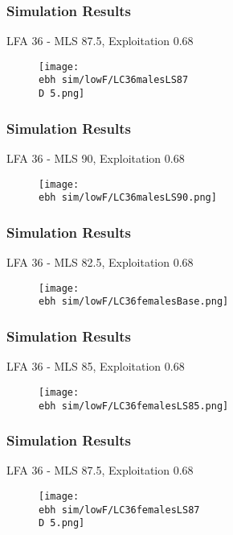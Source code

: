 \documentclass{beamer}
\newcommand{\ebh}{/SpinDr/backup/bio_data/bio.lobster/figures/LFA3438Framework2019/Brad/} %
\newcommand{\D}{.}
\begin{document}
\begin{frame}
\frametitle{Simulation Results}
LFA 36 - MLS 87.5, Exploitation 0.68
\begin{figure}
        \begin{center}
            \texttt{[image: \\ebh sim/lowF/LC36malesLS87\\D 5.png]}
        \end{center}
    \end{figure}
\end{frame}


\begin{frame}
\frametitle{Simulation Results}
LFA 36 - MLS 90, Exploitation 0.68
\begin{figure}
        \begin{center}
            \texttt{[image: \\ebh sim/lowF/LC36malesLS90.png]}
        \end{center}
    \end{figure}
\end{frame}




\begin{frame}
\frametitle{Simulation Results}
LFA 36 - MLS 82.5, Exploitation 0.68
\begin{figure}
        \begin{center}
            \texttt{[image: \\ebh sim/lowF/LC36femalesBase.png]}
        \end{center}
    \end{figure}
\end{frame}



\begin{frame}
\frametitle{Simulation Results}
LFA 36 - MLS 85, Exploitation 0.68
\begin{figure}
        \begin{center}
            \texttt{[image: \\ebh sim/lowF/LC36femalesLS85.png]}
        \end{center}
    \end{figure}
\end{frame}


\begin{frame}
\frametitle{Simulation Results}
LFA 36 - MLS 87.5, Exploitation 0.68
\begin{figure}
        \begin{center}
            \texttt{[image: \\ebh sim/lowF/LC36femalesLS87\\D 5.png]}
        \end{center}
    \end{figure}
\end{frame}
\end{document}
